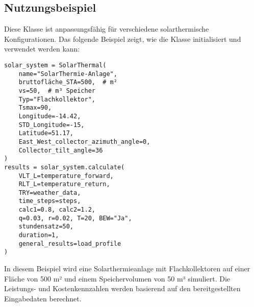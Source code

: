 \subsection{Nutzungsbeispiel}
Diese Klasse ist anpassungsfähig für verschiedene solarthermische Konfigurationen. Das folgende Beispiel zeigt, wie die Klasse initialisiert und verwendet werden kann:

\begin{verbatim}
solar_system = SolarThermal(
    name="SolarThermie-Anlage",
    bruttofläche_STA=500,  # m²
    vs=50,  # m³ Speicher
    Typ="Flachkollektor",
    Tsmax=90, 
    Longitude=-14.42, 
    STD_Longitude=-15, 
    Latitude=51.17, 
    East_West_collector_azimuth_angle=0, 
    Collector_tilt_angle=36
)
results = solar_system.calculate(
    VLT_L=temperature_forward, 
    RLT_L=temperature_return, 
    TRY=weather_data, 
    time_steps=steps, 
    calc1=0.8, calc2=1.2, 
    q=0.03, r=0.02, T=20, BEW="Ja", 
    stundensatz=50, 
    duration=1, 
    general_results=load_profile
)
\end{verbatim}
In diesem Beispiel wird eine Solarthermieanlage mit Flachkollektoren auf einer Fläche von 500 m² und einem Speichervolumen von 50 m³ simuliert. Die Leistungs- und Kostenkennzahlen werden basierend auf den bereitgestellten Eingabedaten berechnet.
